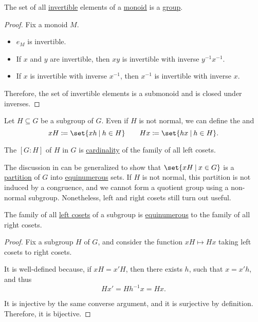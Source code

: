 \begin{proposition}\label{thm:invertible_submonoid_is_group}
  The set of all \hyperref[def:monoid_inverse]{invertible} elements of a \hyperref[def:monoid]{monoid} is a \hyperref[def:group]{group}.
\end{proposition}
\begin{proof}
  Fix a monoid \( M \).

  \begin{itemize}
    \item \( e_M \) is invertible.
    \item If \( x \) and \( y \) are invertible, then \( xy \) is invertible with inverse \( y^{-1} x^{-1} \).
    \item If \( x \) is invertible with inverse \( x^{-1} \), then \( x^{-1} \) is invertible with inverse \( x \).
  \end{itemize}

  Therefore, the set of invertible elements is a submonoid and is closed under inverses.
\end{proof}

\begin{definition}\label{def:subgroup_cosets}
  Let \( H \subseteq G \) be a subgroup of \( G \). Even if \( H \) is not normal, we can define the  and 
  \begin{equation*}
    x H \coloneqq \set{ xh \given h \in H }
    \quad\quad
    H x \coloneqq \set{ hx \given h \in H }.
  \end{equation*}

  The  \( [G : H] \) of \( H \) in \( G \) is \hyperref[def:cardinal]{cardinality} of the family of all left cosets.

  The discussion in  can be generalized to show that  \( \set{ xH \given x \in G } \) is a \hyperref[def:set_partition]{partition} of \( G \) into \hyperref[def:equinumerosity]{equinumerous} sets. If \( H \) is not normal, this partition is not induced by a congruence, and we cannot form a quotient group using a non-normal subgroup. Nonetheless, left and right cosets still turn out useful.
\end{definition}

\begin{proposition}\label{thm:group_coset_bijection}
  The family of all \hyperref[def:subgroup_cosets]{left cosets} of a subgroup is \hyperref[def:equinumerosity]{equinumerous} to the family of all right cosets.
\end{proposition}
\begin{proof}
  Fix a subgroup \( H \) of \( G \), and consider the function \( xH \mapsto Hx \) taking left cosets to right cosets.

  It is well-defined because, if \( x H = x' H \), then there exists \( h \), such that \( x = x' h \), and thus
  \begin{equation*}
    H x' = H h^{-1} x = H x.
  \end{equation*}

  It is injective by the same converse argument, and it is surjective by definition. Therefore, it is bijective.
\end{proof}

